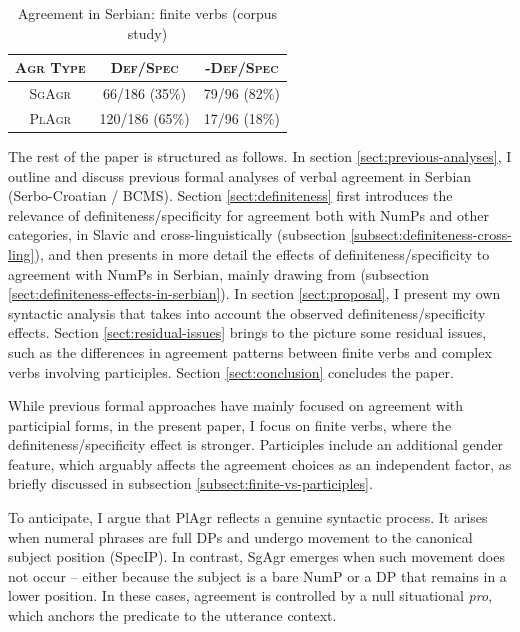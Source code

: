 \documentclass[output=paper,colorlinks,citecolor=brown
]{langscibook}
\begin{document}
 
\begin{table}[hbt!]
    \caption{Agreement in Serbian: finite verbs (corpus study)}
    \label{tab:agreement-serbian}
    \begin{center}
    \begin{tabular}{|c | c c |} 
     \hline
    \textsc{Agr Type} & \textsc{Def/Spec} & \textsc{-Def/Spec}  \\ [0.5ex] 
     \hline\hline
    \textsc{SgAgr}    & 66/186 (35\%)     & 79/96 (82\%)        \\ 
     \hline
    \textsc{PlAgr}    & 120/186 (65\%)    & 17/96 (18\%)        \\ 
     \hline
    \end{tabular}
    \end{center}
\end{table}

\noindent

\noindent The rest of the paper is structured as follows. In section \ref{sect:previous-analyses}, I outline and discuss previous formal analyses of verbal agreement in Serbian (Serbo-Croatian / BCMS). Section \ref{sect:definiteness} first introduces the relevance of definiteness/specificity for agreement both with NumPs and other categories, in Slavic and cross-linguistically (subsection \ref{subsect:definiteness-cross-ling}), and then presents in more detail the effects of definiteness/specificity to agreement with NumPs in Serbian, mainly drawing from \citet{Milosavljevic2017, Milosavljevic2018MS, Milosavljevic2018nasledje} (subsection \ref{sect:definiteness-effects-in-serbian}). In section \ref{sect:proposal}, I present my own syntactic analysis that takes into account the observed definiteness/specificity effects. Section \ref{sect:residual-issues} brings to the picture some residual issues, such as the differences in agreement patterns between finite verbs and complex verbs involving participles. Section \ref{sect:conclusion} concludes the paper.

While previous formal approaches have mainly focused on agreement with participial forms, in the present paper, I focus on finite verbs, where the definiteness/specificity effect is stronger. Participles include an additional gender feature, which arguably affects the agreement choices as an independent factor, as briefly discussed in subsection \ref{subsect:finite-vs-participles}. 

To anticipate, I argue that PlAgr reflects a genuine syntactic process. It arises when numeral phrases are full DPs and undergo movement to the canonical subject position (SpecIP). In contrast, SgAgr emerges when such movement does not occur -- either because the subject is a bare NumP or a DP that remains in a lower position. In these cases, agreement is controlled by a null situational \textit{pro}, which anchors the predicate to the utterance context.
\end{document}
